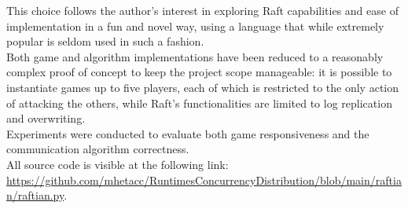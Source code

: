 This choice follows the author's interest in exploring Raft capabilities and ease of implementation in a fun and novel way, using a language that while extremely popular is seldom used in such a fashion.\\
Both game and algorithm implementations have been reduced to a reasonably complex proof of concept to keep the project scope manageable: it is possible to instantiate games up to five players, each of which is restricted to the only action of attacking the others, while Raft's functionalities are limited to log replication and overwriting. \\
Experiments were conducted to evaluate both game responsiveness and the communication algorithm correctness. \\
All source code is visible at the following link: \url{https://github.com/mhetacc/RuntimesConcurrencyDistribution/blob/main/raftian/raftian.py}.
